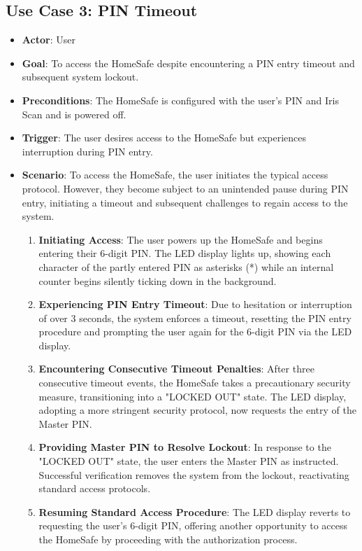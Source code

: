 \documentclass{article}
\begin{document}
\subsection{Use Case 3: PIN Timeout}
\begin{itemize}
    \item \textbf{Actor}: User
    \item \textbf{Goal}: To access the HomeSafe despite encountering a PIN entry timeout and subsequent system lockout.
    \item \textbf{Preconditions}: The HomeSafe is configured with the user’s PIN and Iris Scan and is powered off.
    \item \textbf{Trigger}: The user desires access to the HomeSafe but experiences interruption during PIN entry.
    \item \textbf{Scenario}: To access the HomeSafe, the user initiates the typical access protocol. However, they become subject to an unintended pause during PIN entry, initiating a timeout and subsequent challenges to regain access to the system.
    \begin{enumerate}
    \item \textbf{Initiating Access}: The user powers up the HomeSafe and begins entering their 6-digit PIN. The LED display lights up, showing each character of the partly entered PIN as asterisks (*) while an internal counter begins silently ticking down in the background.
    \item \textbf{Experiencing PIN Entry Timeout}: Due to hesitation or interruption of over 3 seconds, the system enforces a timeout, resetting the PIN entry procedure and prompting the user again for the 6-digit PIN via the LED display.
    \item \textbf{Encountering Consecutive Timeout Penalties}: After three consecutive timeout events, the HomeSafe takes a precautionary security measure, transitioning into a "LOCKED OUT" state. The LED display, adopting a more stringent security protocol, now requests the entry of the Master PIN.
    \item \textbf{Providing Master PIN to Resolve Lockout}:  In response to the "LOCKED OUT" state, the user enters the Master PIN as instructed. Successful verification removes the system from the lockout, reactivating standard access protocols.
    \item \textbf{Resuming Standard Access Procedure}: The LED display reverts to requesting the user’s 6-digit PIN, offering another opportunity to access the HomeSafe by proceeding with the authorization process.
    \end{enumerate}
\end{itemize}
\end{document}

